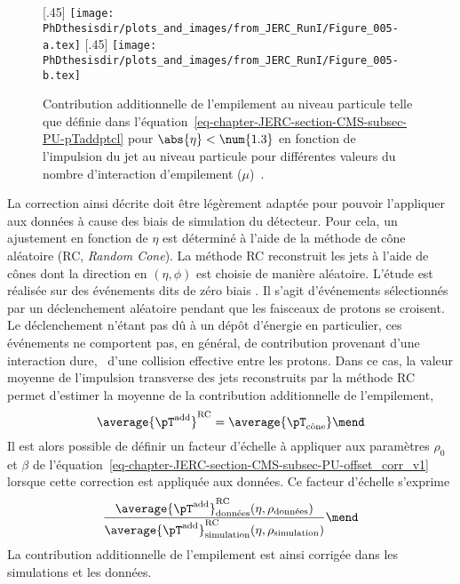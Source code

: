 \begin{figure}[h]
\centering
{}[.45\textwidth]
{\texttt{[image: \\PhDthesisdir/plots\_and\_images/from\_JERC\_RunI/Figure\_005-a.tex]}}
\hfill
{}[.45\textwidth]
{\texttt{[image: \\PhDthesisdir/plots\_and\_images/from\_JERC\_RunI/Figure\_005-b.tex]}}
\caption[Contribution additionnelle de l'empilement au niveau particule.]{Contribution additionnelle de l'empilement au niveau particule telle que définie dans l'équation~\eqref{eq-chapter-JERC-section-CMS-subsec-PU-pTaddptcl} pour $\abs{\eta}<\num{1.3}$ en fonction de l'impulsion du jet au niveau particule pour différentes valeurs du nombre d'interaction d'empilement ($\mu$)~\cite{JERC_RunI}.}
\label{fig-chapter-JERC-section-CMS-subsec-PU-JERC_RunI-Figure_005}
\end{figure}
\par La correction ainsi décrite doit être légèrement adaptée pour pouvoir l'appliquer aux données à cause des biais de simulation du détecteur.
Pour cela, un ajustement en fonction de $\eta$ est déterminé à l'aide de la méthode de cône aléatoire (RC, \emph {Random Cone}). La méthode RC reconstruit les jets à l'aide de cônes dont la direction en $(\eta, \phi)$ est choisie de manière aléatoire.
L'étude est réalisée sur des événements dits de \og zéro biais \fg.
Il s'agit d'événements sélectionnés par un déclenchement aléatoire pendant que les faisceaux de protons se croisent.
Le déclenchement n'étant pas dû à un dépôt d'énergie en particulier, ces événements ne comportent pas, en général, de contribution provenant d'une interaction dure, \ie\ d'une collision effective entre les protons.
Dans ce cas, la valeur moyenne de l'impulsion transverse des jets reconstruits par la méthode RC permet d'estimer la moyenne de la contribution additionnelle de l'empilement, \ie
\begin{equation}
\average{\pT^\text{add}}^\text{RC} = \average{\pT_\text{cône}}
\mend
\end{equation}
Il est alors possible de définir un facteur d'échelle à appliquer aux paramètres $\rho_0$ et $\beta$ de l'équation~\eqref{eq-chapter-JERC-section-CMS-subsec-PU-offset_corr_v1} lorsque cette correction est appliquée aux données. Ce facteur d'échelle s'exprime
\begin{equation}
\frac{\average{\pT^\text{add}}^\text{RC}_\text{données}(\eta, \rho_\text{données})}{\average{\pT^\text{add}}^\text{RC}_\text{simulation}(\eta, \rho_\text{simulation})}
\mend
\end{equation}
La contribution additionnelle de l'empilement est ainsi corrigée dans les simulations et les données.
